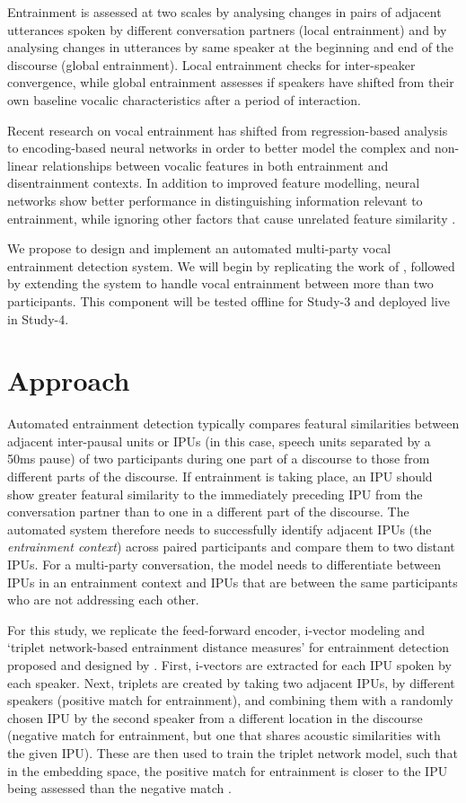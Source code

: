Entrainment is assessed at two scales by analysing changes in pairs of adjacent
utterances spoken by different conversation partners (local entrainment) and by
analysing changes in utterances by same speaker at the beginning and end of the
discourse (global entrainment). Local entrainment checks for inter-speaker
convergence, while global entrainment assesses if speakers have shifted from
their own baseline vocalic characteristics after a period of interaction.

Recent research on vocal entrainment has shifted from regression-based
analysis to encoding-based neural networks in order to better model the
complex and non-linear relationships between vocalic features in both
entrainment and disentrainment contexts. In addition to improved feature
modelling, neural networks show better performance in distinguishing
information relevant to entrainment, while ignoring other factors that
cause unrelated feature similarity \citep{nasir2020}.

We propose to design and implement an automated multi-party vocal entrainment
detection system. We will begin by replicating the work of \citet{nasir2020},
followed by extending the system to handle vocal entrainment between more than
two participants. This component will be tested offline for Study-3 and
deployed live in Study-4.

\section{Approach}

Automated entrainment detection typically compares featural similarities
between adjacent inter-pausal units or IPUs (in this case, speech units
separated by a 50ms pause) of two participants during one part of a discourse
to those from different parts of the discourse. If entrainment is taking place,
an IPU should show greater featural similarity to the immediately preceding IPU
from the conversation partner than to one in a different part of the discourse.
The automated system therefore needs to successfully identify adjacent IPUs
(the \emph{entrainment context}) across paired participants and compare them
to two distant IPUs. For a multi-party conversation, the model needs to
differentiate between IPUs in an entrainment context and IPUs that are
between the same participants who are not addressing each other.

For this study, we replicate the feed-forward encoder, i-vector modeling and
`triplet network-based entrainment distance measures' for entrainment detection
proposed and designed by \citet{nasir2020}. First, i-vectors are
extracted for each IPU spoken by each speaker. Next, triplets are created by
taking two adjacent IPUs, by different
speakers (positive match for entrainment), and combining them with a randomly
chosen IPU by the second speaker from a different location in the discourse
(negative match for entrainment, but one that shares acoustic similarities with
the given IPU). These are then used to train the triplet network
model, such that in the embedding space, the positive match for entrainment is
closer to the IPU being assessed than the negative match \cite{hoffer2015deep}.

